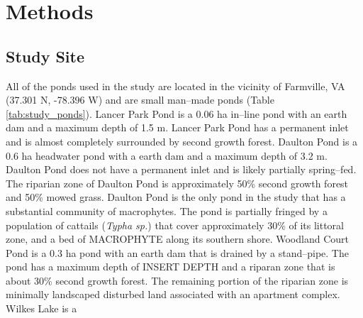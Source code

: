 \section{Methods}
\subsection{Study Site}
All of the ponds used in the study are located in the vicinity of Farmville, VA (37.301 N, -78.396 W) and are small man--made ponds (Table \ref{tab:study_ponds}).  Lancer Park Pond is a 0.06 ha in--line pond with an earth dam and a maximum depth of 1.5 m. Lancer Park Pond has a permanent inlet and is almost completely surrounded by second growth forest. Daulton Pond is a 0.6 ha headwater pond with a earth dam and a maximum depth of 3.2 m. Daulton Pond does not have a permanent inlet and is likely partially spring--fed. The riparian zone of Daulton Pond is approximately 50\% second growth forest and 50\% mowed grass. Daulton Pond is the only pond in the study that has a substantial community of macrophytes. The pond is partially fringed by a population of cattails (\emph{Typha sp.}) that cover approximately 30\% of its littoral zone, and a bed of MACROPHYTE along its southern shore. Woodland Court Pond is a 0.3 ha pond with an earth dam that is drained by a stand--pipe. The pond has a maximum depth of INSERT DEPTH and a riparan zone that is about 30\% second growth forest. The remaining portion of the riparian zone is minimally landscaped disturbed land associated with an apartment complex. Wilkes Lake is a 


    
